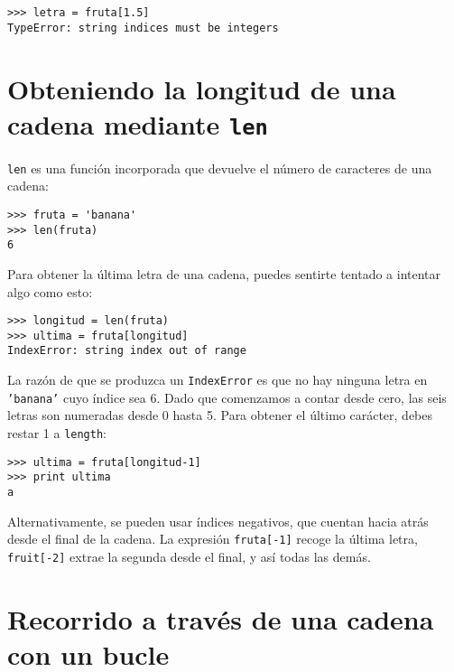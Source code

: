 
\beforeverb
\begin{verbatim}
>>> letra = fruta[1.5]
TypeError: string indices must be integers
\end{verbatim}
\afterverb
%

\section{Obteniendo la longitud de una cadena mediante {\tt len}}


{\tt len} es una función incorporada que devuelve el número de caracteres
de una cadena:

\beforeverb
\begin{verbatim}
>>> fruta = 'banana'
>>> len(fruta)
6
\end{verbatim}
\afterverb
%
Para obtener la última letra de una cadena, puedes sentirte tentado a intentar
algo como esto:


\beforeverb
\begin{verbatim}
>>> longitud = len(fruta)
>>> ultima = fruta[longitud]
IndexError: string index out of range
\end{verbatim}
\afterverb
%
La razón de que se produzca un {\tt IndexError} es que no hay ninguna letra
en {\tt 'banana'} cuyo índice sea 6. Dado que comenzamos a contar desde cero, las
seis letras son numeradas desde 0 hasta 5. Para obtener el último carácter, debes
restar 1 a {\tt length}:

\beforeverb
\begin{verbatim}
>>> ultima = fruta[longitud-1]
>>> print ultima
a
\end{verbatim}
\afterverb
%
Alternativamente, se pueden usar índices negativos, que cuentan hacia atrás desde
el final de la cadena. La expresión {\tt fruta[-1]} recoge la última
letra, {\tt fruit[-2]} extrae la segunda desde el final, y así todas las demás.



\section{Recorrido a través de una cadena con un bucle}
\label{for}


